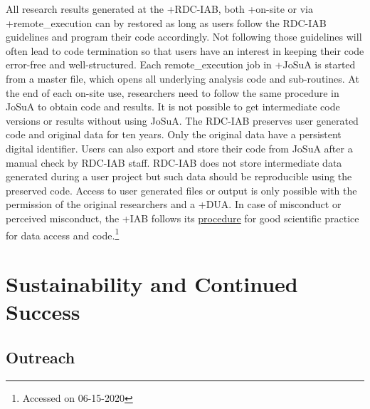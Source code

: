 \documentclass[
]{book}
\begin{document}
All research results generated at the +RDC-IAB\textbar, both +on-site\textbar{} or via +remote\_execution\textbar{} can by restored as long as users follow the RDC-IAB guidelines and program their code accordingly. Not following those guidelines will often lead to code termination so that users have an interest in keeping their code error-free and well-structured. Each remote\_execution job in +JoSuA\textbar{} is started from a master file, which opens all underlying analysis code and sub-routines. At the end of each on-site use, researchers need to follow the same procedure in JoSuA to obtain code and results. It is not possible to get intermediate code versions or results without using JoSuA. The RDC-IAB preserves user generated code and original data for ten years. Only the original data have a persistent digital identifier. Users can also export and store their code from JoSuA after a manual check by RDC-IAB staff. RDC-IAB does not store intermediate data generated during a user project but such data should be reproducible using the preserved code. Access to user generated files or output is only possible with the permission of the original researchers and a +DUA\textbar. In case of misconduct or perceived misconduct, the +IAB\textbar{} follows its \href{https://www.iab.de/en/daten/replikationen.aspx}{procedure} for good scientific practice for data access and code.\footnote{Accessed on 06-15-2020}

\hypertarget{sustainability-and-continued-success}{%
\section{Sustainability and Continued Success}\label{sustainability-and-continued-success}}

\hypertarget{outreach}{%
\subsection{Outreach}\label{outreach}}
\end{document}

